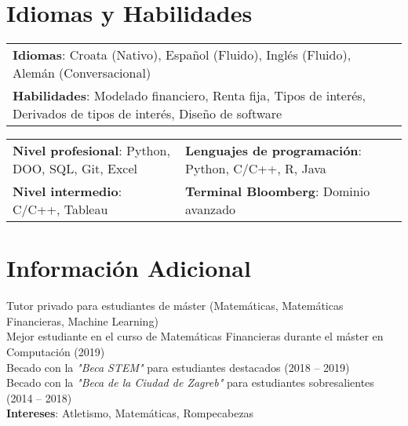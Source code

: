\documentclass[letterpaper,10pt]{article}
\begin{document}
%
\section{Idiomas y Habilidades}
\begin{center}
\begin{tabularx}{0.96\textwidth} { 
  >{\raggedright\arraybackslash}X
}
  \small{\textbf{Idiomas}: Croata (Nativo), Español (Fluido), Inglés (Fluido), Alemán (Conversacional)}\\
  \small{\textbf{Habilidades}: Modelado financiero, Renta fija, Tipos de interés, Derivados de tipos de interés, Diseño de software}
\end{tabularx}
\end{center}

\begin{center}
\begin{tabularx}{0.96\textwidth} { 
  >{\raggedright\arraybackslash}X 
   >{\raggedright\arraybackslash}X 
   >{\raggedright\arraybackslash}X 
   >{\raggedright\arraybackslash}X
}
\small{\textbf{Nivel profesional}: Python, DOO, SQL, Git, Excel} & \small{\hspace{3pt}\textbf{Lenguajes de programación}: Python, C/C++, R, Java} \\
\small{\textbf{Nivel intermedio}: C/C++, Tableau} & \small{\hspace{3pt}\textbf{Terminal Bloomberg}: Dominio avanzado} \\
\end{tabularx}
\end{center}


\section{Información Adicional}
\begin{itemize}[leftmargin=0.15in, label={}]
  \small{\item{
  	 Tutor privado para estudiantes de máster (Matemáticas, Matemáticas Financieras, Machine Learning)\\
     Mejor estudiante en el curso de Matemáticas Financieras durante el máster en Computación (2019) \\
     Becado con la \textit{"Beca STEM"} para estudiantes destacados (2018 -- 2019) \\
     Becado con la \textit{"Beca de la Ciudad de Zagreb"} para estudiantes sobresalientes (2014 -- 2018) \\ \vspace{3pt}
     \textbf{Intereses}: Atletismo, Matemáticas, Rompecabezas
    }}
\end{itemize}


\end{document}
